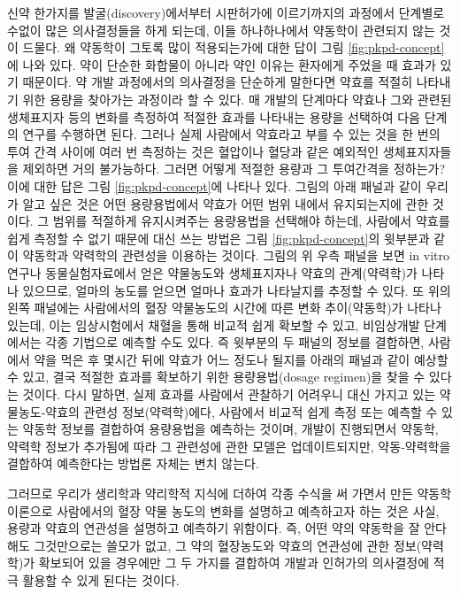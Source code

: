 \documentclass[
  11pt,
  krantz2, a4paper, twoside]{krantz}
\theoremstyle{definition}
\theoremstyle{definition}
\theoremstyle{definition}
\theoremstyle{definition}
\theoremstyle{remark}
\begin{document}
신약 한가지를 발굴(discovery)에서부터 시판허가에 이르기까지의 과정에서
단계별로 수없이 많은 의사결정들을 하게 되는데, 이들 하나하나에서
약동학이 관련되지 않는 것이 드물다. 왜 약동학이 그토록 많이 적용되는가에
대한 답이 그림 \ref{fig:pkpd-concept}에 나와 있다. 약이 단순한 화합물이 아니라 약인 이유는
환자에게 주었을 때 효과가 있기 때문이다. 약 개발 과정에서의 의사결정을
단순하게 말한다면 약효를 적절히 나타내기 위한 용량을 찾아가는 과정이라
할 수 있다. 매 개발의 단계마다 약효나 그와 관련된 생체표지자 등의 변화를
측정하여 적절한 효과를 나타내는 용량을 선택하여 다음 단계의 연구를
수행하면 된다. 그러나 실제 사람에서 약효라고 부를 수 있는 것을 한 번의
투여 간격 사이에 여러 번 측정하는 것은 혈압이나 혈당과 같은 예외적인
생체표지자들을 제외하면 거의 불가능하다. 그러면 어떻게 적절한 용량과 그
투여간격을 정하는가? 이에 대한 답은 그림 \ref{fig:pkpd-concept}에 나타나 있다. 그림의 아래
패널과 같이 우리가 알고 싶은 것은 어떤 용량용법에서 약효가 어떤 범위
내에서 유지되는지에 관한 것이다. 그 범위를 적절하게 유지시켜주는
용량용법을 선택해야 하는데, 사람에서 약효를 쉽게 측정할 수 없기 때문에
대신 쓰는 방법은 그림 \ref{fig:pkpd-concept}의 윗부분과 같이 약동학과 약력학의 관련성을
이용하는 것이다. 그림의 위 우측 패널을 보면 in vitro 연구나
동물실험자료에서 얻은 약물농도와 생체표지자나 약효의 관계(약력학)가
나타나 있으므로, 얼마의 농도를 얻으면 얼마나 효과가 나타날지를 추정할 수
있다. 또 위의 왼쪽 패널에는 사람에서의 혈장 약물농도의 시간에 따른 변화
추이(약동학)가 나타나 있는데, 이는 임상시험에서 채혈을 통해 비교적 쉽게
확보할 수 있고, 비임상개발 단계에서는 각종 기법으로 예측할 수도 있다.
즉 윗부분의 두 패널의 정보를 결합하면, 사람에서 약을 먹은 후 몇시간 뒤에 약효가 어느 정도나 될지를 아래의 패널과 같이 예상할 수 있고,
결국 적절한 효과를 확보하기 위한 용량용법(dosage regimen)을 찾을 수 있다는 것이다. 다시
말하면, 실제 효과를 사람에서 관찰하기 어려우니 대신 가지고 있는
약물농도-약효의 관련성 정보(약력학)에다, 사람에서 비교적 쉽게 측정 또는
예측할 수 있는 약동학 정보를 결합하여 용량용법을 예측하는 것이며, 개발이
진행되면서 약동학, 약력학 정보가 추가됨에 따라 그 관련성에 관한 모델은 업데이트되지만,
약동-약력학을 결합하여 예측한다는 방법론 자체는 변치 않는다.

그러므로 우리가 생리학과 약리학적 지식에 더하여 각종 수식을 써 가면서
만든 약동학 이론으로 사람에서의 혈장 약물 농도의 변화를 설명하고
예측하고자 하는 것은 사실, 용량과 약효의 연관성을 설명하고 예측하기
위함이다. 즉, 어떤 약의 약동학을 잘 안다 해도 그것만으로는 쓸모가 없고,
그 약의 혈장농도와 약효의 연관성에 관한 정보(약력학)가 확보되어 있을
경우에만 그 두 가지를 결합하여 개발과 인허가의 의사결정에 적극 활용할 수
있게 된다는 것이다.
\end{document}
